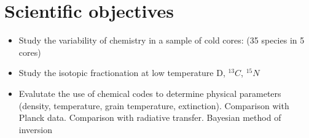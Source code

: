 \section{Scientific objectives}
\begin{itemize}
\item{Study the variability of chemistry in a sample of cold cores: (35 species in 5 cores)}
\item{Study the isotopic fractionation at low temperature D, $^{13}C$, $^{15}N$}
\item{Evalutate the use of chemical codes  to determine physical parameters (density, temperature, grain temperature, extinction). Comparison with Planck data. Comparison with radiative transfer. Bayesian method of inversion}
\end{itemize}
  
  
  